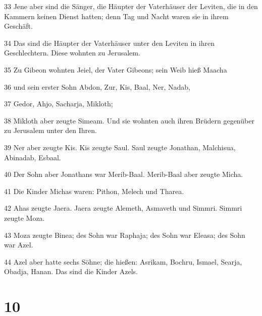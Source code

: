 \par 33 Jene aber sind die Sänger, die Häupter der Vaterhäuser der Leviten, die in den Kammern keinen Dienst hatten; denn Tag und Nacht waren sie in ihrem Geschäft.
\par 34 Das sind die Häupter der Vaterhäuser unter den Leviten in ihren Geschlechtern. Diese wohnten zu Jerusalem.
\par 35 Zu Gibeon wohnten Jeiel, der Vater Gibeons; sein Weib hieß Maacha
\par 36 und sein erster Sohn Abdon, Zur, Kis, Baal, Ner, Nadab,
\par 37 Gedor, Ahjo, Sacharja, Mikloth;
\par 38 Mikloth aber zeugte Simeam. Und sie wohnten auch ihren Brüdern gegenüber zu Jerusalem unter den Ihren.
\par 39 Ner aber zeugte Kis. Kis zeugte Saul. Saul zeugte Jonathan, Malchisua, Abinadab, Esbaal.
\par 40 Der Sohn aber Jonathans war Merib-Baal. Merib-Baal aber zeugte Micha.
\par 41 Die Kinder Michas waren: Pithon, Melech und Tharea.
\par 42 Ahas zeugte Jaera. Jaera zeugte Alemeth, Asmaveth und Simmri. Simmri zeugte Moza.
\par 43 Moza zeugte Binea; des Sohn war Raphaja; des Sohn war Eleasa; des Sohn war Azel.
\par 44 Azel aber hatte sechs Söhne; die hießen: Asrikam, Bochru, Ismael, Searja, Obadja, Hanan. Das sind die Kinder Azels.

\chapter{10}

